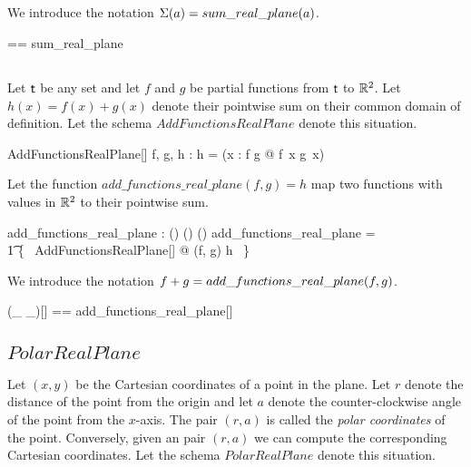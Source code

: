 \documentclass[11pt, oneside]{article}
\begin{document}
\subsection{}

We introduce the notation $\Sigma(a) = sum\_real\_plane(a)$.

\begin{zed}
	\sumRtwo == sum\_real\_plane
\end{zed}

\subsection{}

Let $\mathsf{t}$ be any set and let $f$ and $g$ be partial functions from $\mathsf{t}$ to $\mathbb{R}^2$.
Let $h(x) = f(x) + g(x)$ denote their pointwise sum on their common domain of definition.
Let the schema $AddFunctionsRealPlane$ denote this situation.

\begin{schema}{AddFunctionsRealPlane}[\genT]
	f, g, h : \genT \pfun \Rtwo
\where
	h = (\lambda x : \dom f \cap \dom g @ f~x \addRtwo g~x)
\end{schema}

Let the function $add\_functions\_real\_plane(f, g) = h$ map two functions with values in $\mathbb{R}^2$ to their pointwise sum.

\begin{gendef}[\genT]
	add\_functions\_real\_plane : (\genT \pfun \Rtwo) \cross (\genT \pfun \Rtwo) \fun (\genT \pfun \Rtwo)
\where
	add\_functions\_real\_plane = \\
	\t1	\{~ AddFunctionsRealPlane[\genT] @ (f, g) \mapsto h ~\}
\end{gendef}

We introduce the notation $f \mathbin{+} g = add\_functions\_real\_plane(f, g)$.

\begin{zed}
	(\_ \addFRtwo \_)[\genT] == add\_functions\_real\_plane[\genT]
\end{zed}


\subsection{$PolarRealPlane$}

Let $(x, y)$ be the Cartesian coordinates of a point in the plane.
Let $r$ denote the distance of the point from the origin and
let $a$ denote the counter-clockwise angle of the point from the $x$-axis.
The pair $(r, a)$ is called the \textit{polar coordinates} of the point.
Conversely, given an pair $(r, a)$ we can compute the corresponding
Cartesian coordinates.
Let the schema $PolarRealPlane$ denote this situation.
\end{document}
